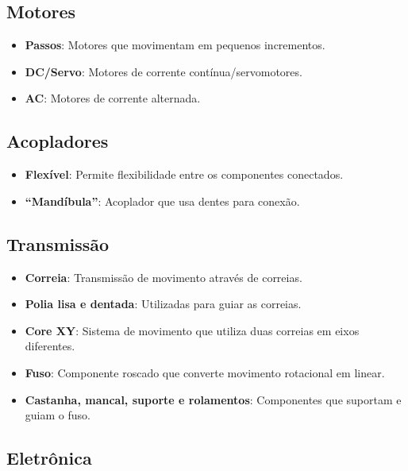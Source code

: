 \documentclass[
]{book}
\providecommand{\tightlist}{%
  \setlength{\itemsep}{0pt}\setlength{\parskip}{0pt}}
\begin{document}
\subsection{Motores}\label{motores}

\begin{itemize}
\tightlist
\item
  \textbf{Passos}: Motores que movimentam em pequenos incrementos.
\item
  \textbf{DC/Servo}: Motores de corrente contínua/servomotores.
\item
  \textbf{AC}: Motores de corrente alternada.
\end{itemize}

\subsection{Acopladores}\label{acopladores}

\begin{itemize}
\tightlist
\item
  \textbf{Flexível}: Permite flexibilidade entre os componentes conectados.
\item
  \textbf{``Mandíbula''}: Acoplador que usa dentes para conexão.
\end{itemize}

\subsection{Transmissão}\label{transmissuxe3o}

\begin{itemize}
\tightlist
\item
  \textbf{Correia}: Transmissão de movimento através de correias.
\item
  \textbf{Polia lisa e dentada}: Utilizadas para guiar as correias.
\item
  \textbf{Core XY}: Sistema de movimento que utiliza duas correias em eixos diferentes.
\item
  \textbf{Fuso}: Componente roscado que converte movimento rotacional em linear.
\item
  \textbf{Castanha, mancal, suporte e rolamentos}: Componentes que suportam e guiam o fuso.
\end{itemize}

\subsection{Eletrônica}\label{eletruxf4nica}
\end{document}
